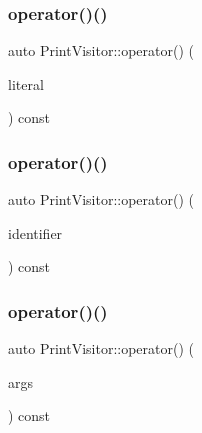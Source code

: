 \mbox{\label{struct_print_visitor_a1db9f78fe8d32c617fcccbe7dd2b9f5c}} 
\subsubsection{\texorpdfstring{operator()()}{operator()()}\hspace{0.1cm}{\footnotesize\ttfamily [6/38]}}
{\footnotesize\ttfamily auto Print\+Visitor\+::operator() (\begin{DoxyParamCaption}\item[{const \hyperlink{struct_string_literal}{String\+Literal} \&}]{literal }\end{DoxyParamCaption}) const\hspace{0.3cm}{\ttfamily [inline]}}

\mbox{\label{struct_print_visitor_aa3bdaae13a1b4edb02010a7def188778}} 
\subsubsection{\texorpdfstring{operator()()}{operator()()}\hspace{0.1cm}{\footnotesize\ttfamily [7/38]}}
{\footnotesize\ttfamily auto Print\+Visitor\+::operator() (\begin{DoxyParamCaption}\item[{const \hyperlink{struct_identifier}{Identifier} \&}]{identifier }\end{DoxyParamCaption}) const\hspace{0.3cm}{\ttfamily [inline]}}

\mbox{\label{struct_print_visitor_a00e74f8c4462bab7aa11f5fec5bb8f0e}} 
\subsubsection{\texorpdfstring{operator()()}{operator()()}\hspace{0.1cm}{\footnotesize\ttfamily [8/38]}}
{\footnotesize\ttfamily auto Print\+Visitor\+::operator() (\begin{DoxyParamCaption}\item[{const \hyperlink{struct_arguments}{Arguments} \&}]{args }\end{DoxyParamCaption}) const\hspace{0.3cm}{\ttfamily [inline]}}

